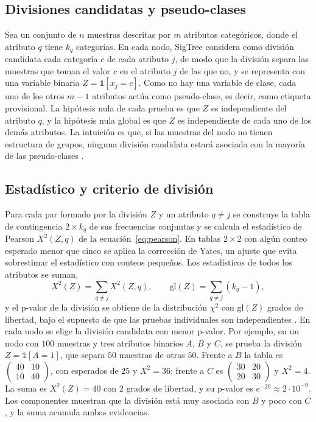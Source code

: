 \subsection{Divisiones candidatas y pseudo-clases}

Sea un conjunto de $n$ muestras descritas por $m$ atributos categóricos, donde el
atributo $q$ tiene $k_q$ categorías. En cada nodo, SigTree considera como división
candidata cada categoría $c$ de cada atributo $j$, de modo que la división separa las muestras
que toman el valor $c$ en el atributo $j$ de las que no, y se representa con una
variable binaria $Z = \mathbb{1}[x_j = c]$. Como no hay una variable de clase,
cada uno de los otros $m-1$ atributos actúa como pseudo-clase, es decir, como etiqueta provisional. La hipótesis
nula de cada prueba es que $Z$ es independiente del atributo $q$, y la hipótesis
nula global es que $Z$ es independiente de cada uno de los demás atributos. La intuición
es que, si las muestras del nodo no tienen estructura de grupos, ninguna división
candidata estará asociada con la mayoría de las pseudo-clases \citep[Sec.~1]{Hu2025}.

\subsection{Estadístico y criterio de división}

Para cada par formado por la división $Z$ y un atributo $q \ne j$ se construye la
tabla de contingencia $2 \times k_q$ de sus frecuencias conjuntas y se calcula el
estadístico de Pearson $X^2(Z, q)$ de la ecuación~\eqref{eq:pearson}. En tablas
$2 \times 2$ con algún conteo esperado menor que cinco se aplica la corrección de Yates, un ajuste que evita sobrestimar el estadístico con conteos pequeños. Los estadísticos de todos los atributos se suman,
\begin{equation}\label{eq:sigtree}
  X^2(Z) = \sum_{q \ne j} X^2(Z, q), \qquad
  \mathrm{gl}(Z) = \sum_{q \ne j} (k_q - 1),
\end{equation}
y el p-valor de la división se obtiene de la distribución $\chi^2$ con
$\mathrm{gl}(Z)$ grados de libertad, bajo el supuesto de que las pruebas
individuales son independientes \citep[Sec.~3.3]{Hu2025}. En cada nodo se elige la
división candidata con menor p-valor. Por ejemplo, en un nodo con $100$ muestras y tres atributos binarios $A$, $B$ y $C$, se prueba la división $Z = \mathbb{1}[A = 1]$, que separa $50$ muestras de otras $50$. Frente a $B$ la tabla es $\begin{pmatrix} 40 & 10 \\ 10 & 40 \end{pmatrix}$, con esperados de $25$ y $X^2 = 36$; frente a $C$ es $\begin{pmatrix} 30 & 20 \\ 20 & 30 \end{pmatrix}$ y $X^2 = 4$. La suma es $X^2(Z) = 40$ con $2$ grados de libertad, y su p-valor es $e^{-20} \approx 2 \cdot 10^{-9}$. Los componentes muestran que la división está muy asociada con $B$ y poco con $C$, y la suma acumula ambas evidencias.

